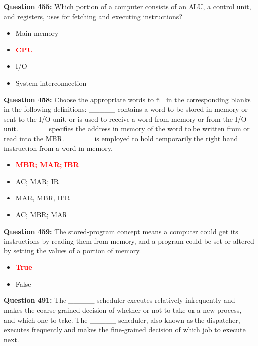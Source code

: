 \documentclass[12pt,a4paper]{article}
\begin{document}
\vspace{0.5cm}

\textbf{Question 455:} Which portion of a computer consists of an ALU, a control unit, and registers, uses for fetching and executing instructions?

\begin{itemize}
    \item[\textbf{A.}] Main memory
    \item[\textbf{B.}] \textcolor{red}{\textbf{CPU}}
    \item[\textbf{C.}] I/O
    \item[\textbf{D.}] System interconnection
\end{itemize}

\vspace{0.5cm}

\textbf{Question 458:} Choose the appropriate words to fill in the corresponding blanks in the following definitions:
_____ contains a word to be stored in memory or sent to the I/O unit, or is used to receive a word from memory or from the I/O unit. _____ specifies the address in memory of the word to be written from or read into the MBR. _____ is employed to hold temporarily the right hand instruction from a word in memory.

\begin{itemize}
    \item[\textbf{A.}] \textcolor{red}{\textbf{MBR; MAR; IBR}}
    \item[\textbf{B.}] AC; MAR; IR
    \item[\textbf{C.}] MAR; MBR; IBR
    \item[\textbf{D.}] AC; MBR; MAR
\end{itemize}

\vspace{0.5cm}

\textbf{Question 459:} The stored-program concept means a computer could get its instructions by reading them from memory, and a program could be set or altered by setting the values of a portion of memory.

\begin{itemize}
    \item[\textbf{A.}] \textcolor{red}{\textbf{True}}
    \item[\textbf{B.}] False
\end{itemize}

\vspace{0.5cm}

\textbf{Question 491:} The _____ scheduler executes relatively infrequently and makes the coarse-grained decision of whether or not to take on a new process, and which one to take. The _____ scheduler, also known as the dispatcher, executes frequently and makes the fine-grained decision of which job to execute next.
\end{document}
